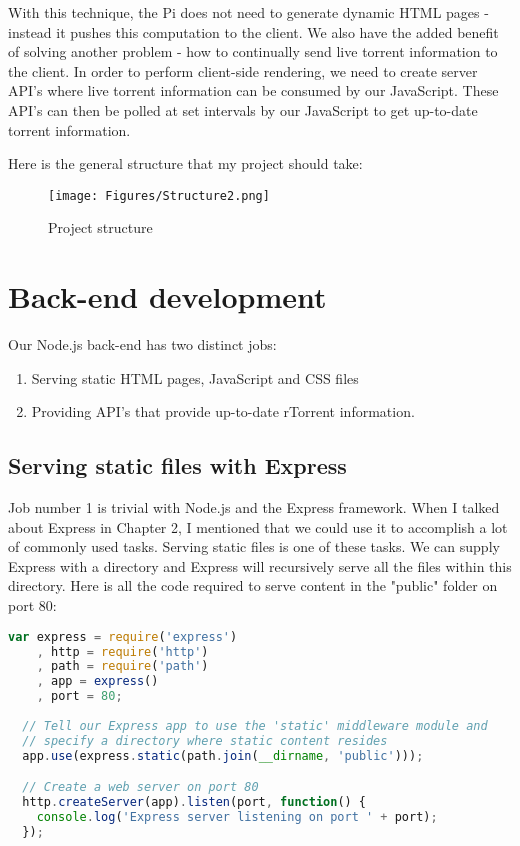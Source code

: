 With this technique, the Pi does not need to generate dynamic HTML pages - instead it pushes this computation to the client. We also have the added benefit of solving another problem - how to continually send live torrent information to the client. In order to perform client-side rendering, we need to create server API's where live torrent information can be consumed by our JavaScript. These API's can then be polled at set intervals by our JavaScript to get up-to-date torrent information.

Here is the general structure that my project should take:

\vspace{10px}
\begin{figure}[h!]
  \centering
    \texttt{[image: Figures/Structure2.png]}
  \caption{Project structure}
\end{figure}


\section{Back-end development}
Our Node.js back-end has two distinct jobs:

\begin{enumerate}
	\item Serving static HTML pages, JavaScript and CSS files
	\item Providing API's that provide up-to-date rTorrent information.
\end{enumerate}

\subsection{Serving static files with Express}
Job number 1 is trivial with Node.js and the Express framework. When I talked about Express in Chapter 2, I mentioned that we could use it to accomplish a lot of commonly used tasks. Serving static files is one of these tasks. We can supply Express with a directory and Express will recursively serve all the files within this directory. Here is all the code required to serve content in the "public" folder on port 80:

\vspace{20px}
\begin{lstlisting}[caption=Express serving static files, language=JavaScript]
  var express = require('express')
    , http = require('http')
    , path = require('path')
    , app = express()
    , port = 80;
 
  // Tell our Express app to use the 'static' middleware module and
  // specify a directory where static content resides
  app.use(express.static(path.join(__dirname, 'public')));

  // Create a web server on port 80
  http.createServer(app).listen(port, function() {
    console.log('Express server listening on port ' + port);
  });
\end{lstlisting}

